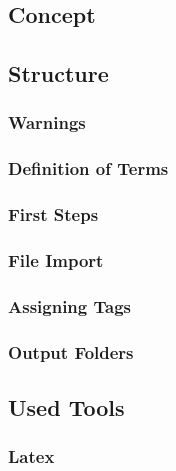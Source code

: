 \subsection{Concept}


\subsection{Structure}

\subsubsection{Warnings}

\subsubsection{Definition of Terms}

\subsubsection{First Steps}

\subsubsection{File Import}

\subsubsection{Assigning Tags}

\subsubsection{Output Folders}

\subsection{Used Tools}

\subsubsection{Latex}
